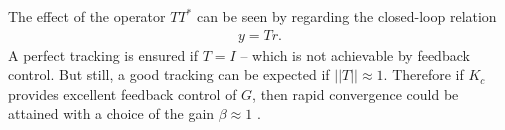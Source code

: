 The effect of the operator $T T^*$ can be seen by regarding the closed-loop relation 
\begin{align}
y = Tr.
\end{align}
A perfect tracking is ensured if $T = I$ -- which is not achievable by feedback control. But still, a good tracking can be expected if $||T|| \approx 1$. 
Therefore if $K_c$ provides excellent feedback control of $G$, then rapid convergence could be attained with a choice of the gain $\beta \approx 1$ \cite{ILC}. %







